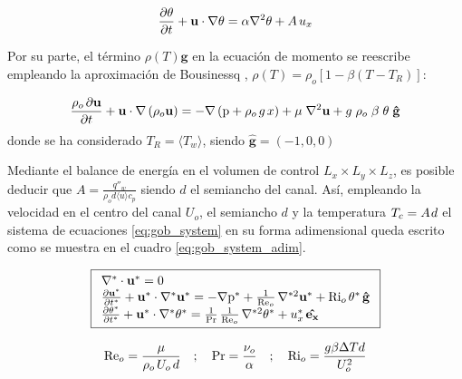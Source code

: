 \begin{equation}
\frac{ \partial \theta }{ \partial t } + \mathbf{u} \cdot \nabla \theta = \alpha \nabla^2 \theta + A \hspace{0.5mm} u_x 
\label{eq:energy_pcb_source}
\end{equation}

Por su parte, el término $\rho(T) \mathbf{g}$ en la ecuación de momento se reescribe empleando la aproximación de Bousinessq \cite{incropera}, $\rho(T) = \rho_o \left[ 1 - \beta (T - T_R) \right]$:

\begin{equation}
\frac{ \rho_o \hspace{0.5mm} \partial \mathbf{u}}{\partial t} + \mathbf{u} \cdot \nabla  \left( \rho_o \mathbf{u} \right) = -\nabla \left( \text{p} + \rho_o \hspace{0.5mm} g \hspace{0.5mm} x \right) + \mu \hspace{1mm} {\nabla}^2 \mathbf{u}  + g \hspace{1mm} \rho_o \hspace{1mm} \beta \hspace{1mm} \theta \hspace{1mm} \mathbf{\hat{g}}   
\end{equation}
donde se ha considerado $T_R = \langle T_w \rangle$, siendo $\mathbf{\hat{g}}=(-1,0,0)$

Mediante el balance de energía en el volumen de control $L_x \times L_y \times L_z$, es posible deducir que $A = \frac{q''_w}{\rho_o  d \langle u \rangle c_p}$ siendo $d$ el semiancho del canal. Así, empleando la velocidad en el centro del canal $U_o$, el semiancho $d$ y la temperatura $T_c = A \hspace{0.3mm} d $ el sistema de ecuaciones \ref{eq:gob_system} en su forma adimensional queda escrito como se muestra en el cuadro \ref{eq:gob_system_adim}.

\begin{equation}
\boxed{
\begin{array}{l}
    \nabla^* \cdot \mathbf{u^*} = 0 \\
    \frac{\partial \mathbf{u^*}}{\partial t^*} + \mathbf{u^*} \cdot \nabla^* \mathbf{u^*} = 
    -\nabla \text{p}^* + \frac{1}{\text{Re}_o} \hspace{0.5mm} \nabla^{*2} \mathbf{u^*} + \text{Ri}_o \hspace{0.5mm} \theta^* \hspace{0.5mm} \mathbf{\hat{g}} \\
    \frac{\partial \theta^*}{\partial t^*} + \mathbf{u^*} \cdot \nabla^* \theta^* = 
    \frac{1}{\text{Pr}}\hspace{0.5mm}  \frac{1}{\text{Re}_o} \hspace{0.5mm} \nabla^{*2} \theta^* + u_x^* \hspace{0.5mm} \mathbf{\hat{e_x}}
\end{array}
}
\label{eq:gob_system_adim}
\end{equation}

$$\text{Re}_o = \frac{\mu}{\rho_o \hspace{0.5mm} U_o\hspace{0.5mm} d } \quad ; \quad \text{Pr}= \frac{\nu_o}{\alpha} \quad ; \quad \text{Ri}_o = \frac{g \beta \Delta T d}{U_o^2}$$



